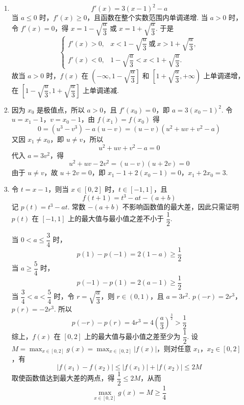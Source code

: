 \begin{solution}
\begin{enumerate}
\item
\[
f'(x)=3(x-1)^2-a
\]
当 \(a\leqslant0\) 时，\(f'(x)\geqslant0\)，且函数在整个实数范围内单调递增.
当 \(a>0\) 时，令 \(f'(x)=0\)，得
\(x=1-\sqrt{\dfrac a3}\) 或 \(x=1+\sqrt{\dfrac a3}\). 于是
\[
\begin{cases}
f'(x)>0,&x<1-\sqrt{\dfrac a3}\ \text{或}\ x>1+\sqrt{\dfrac a3},\\
f'(x)<0,&1-\sqrt{\dfrac a3}<x<1+\sqrt{\dfrac a3}.
\end{cases}
\]
故当 \(a>0\) 时，\(f(x)\) 在 \(\left(-\infty,1-\sqrt{\dfrac a3}\right]\) 和 \(\left[1+\sqrt{\dfrac a3},+\infty\right)\) 上单调递增，在 \(\left[1-\sqrt{\dfrac a3},1+\sqrt{\dfrac a3}\right]\) 上单调递减.

\item 因为 \(x_0\) 是极值点，所以 \(a>0\)，且
\(f'(x_0)=0\)，即 \(a=3(x_0-1)^2\). 令 \(u=x_1-1\)，\(v=x_0-1\)，由 \(f(x_1)=f(x_0)\) 得
\[
0=(u^3-v^3)-a(u-v)=(u-v)(u^2+uv+v^2-a)
\]
又因 \(x_1\neq x_0\)，即 \(u\neq v\)，所以
\[
u^2+uv+v^2-a=0
\]
代入 \(a=3v^2\)，得
\[
u^2+uv-2v^2=(u-v)(u+2v)=0
\]
由于 \(u\neq v\)，故 \(u+2v=0\)，即
\(x_1-1+2(x_0-1)=0\)，\(x_1+2x_0=3\).

\item 令 \(t=x-1\)，则当 \(x\in[0,2]\) 时，\(t\in[-1,1]\)，且
\[
f(t+1)=t^3-at-(a+b)
\]
记 \(p(t)=t^3-at\). 常数 \(-(a+b)\) 不影响函数值的最大差，因此只需证明 \(p(t)\) 在 \([-1,1]\) 上的最大值与最小值之差不小于 \(\dfrac12\).

当 \(0<a\leqslant\dfrac34\) 时，
\[
p(1)-p(-1)=2(1-a)\geqslant\frac12
\]
当 \(a\geqslant\dfrac54\) 时，
\[
p(-1)-p(1)=2(a-1)\geqslant\frac12
\]
当 \(\dfrac34<a<\dfrac54\) 时，令 \(r=\sqrt{\dfrac a3}\)，则 \(r\in(0,1)\)，且 \(a=3r^2\).
\(p(-r)=2r^3\)，\(p(r)=-2r^3\).
所以
\[
p(-r)-p(r)=4r^3=4\left(\frac a3\right)^{\frac32}>\frac12
\]
综上，\(f(x)\) 在 \([0,2]\) 上的最大值与最小值之差至少为 \(\dfrac12\). 设
\(M=\max_{x\in[0,2]}g(x)=\max_{x\in[0,2]}|f(x)|\)，则对任意 \(x_1\)，\(x_2\in[0,2]\)，有
\[
|f(x_1)-f(x_2)|\leqslant|f(x_1)|+|f(x_2)|\leqslant2M
\]
取使函数值达到最大差的两点，得 \(\dfrac12\leqslant2M\)，从而
\[
\max_{x\in[0,2]}g(x)=M\geqslant\frac14
\]
\end{enumerate}
\end{solution}
